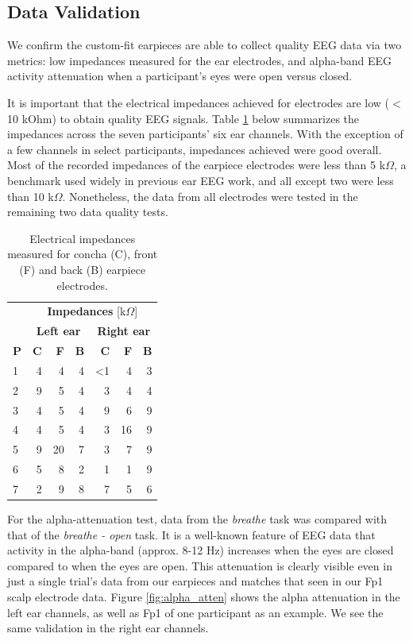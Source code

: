 \documentclass{sigchi}
\begin{document}
\subsection{Data Validation}

We confirm the custom-fit earpieces are able to collect quality EEG data via two metrics: low impedances measured for the ear electrodes, and alpha-band EEG activity attenuation when a participant's eyes were open versus closed.

It is important that the electrical impedances achieved for electrodes are low ($<$10 kOhm) to obtain quality EEG signals. Table \ref{tab:impedances} below summarizes the impedances across the seven participants' six ear channels. With the exception of a few channels in select participants, impedances achieved were good overall. Most of the recorded impedances of the earpiece electrodes were less than 5 k\(\Omega\), a benchmark used widely in previous ear EEG work, and all except two were less than 10 k\(\Omega\). Nonetheless, the data from all electrodes were tested in the remaining two data quality tests.

\begin{table}[h]
\begin{center}
\begin{tabular}{lrrrrrr}
& \multicolumn{6}{c}{\textbf{Impedances} [k\(\Omega\)]} \\
\cline{2-7}
& \multicolumn{3}{|c|}{\textbf{Left ear}} & \multicolumn{3}{c|}{\textbf{Right ear}} \\
\textbf{P} & \textbf{C} & \textbf{F} & \textbf{B} & \textbf{C} & \textbf{F} & \textbf{B} \\
\hline
1 & 4 & 4 & 4 & \textless1 & 4 & 3\\
2 & 9 & 5 & 4 & 3 & 4 & 4\\
3 & 4 & 5 & 4 & 9 & 6 & 9\\
4 & 4 & 5 & 4 & 3 & 16 & 9\\
5 & 9 & 20 & 7 & 3 & 7 & 9\\
6 & 5 & 8 & 2 & 1 & 1 & 9\\
7 & 2 & 9 & 8 & 7 & 5 & 6\\
\end{tabular}
\end{center}
\caption{Electrical impedances measured for concha (C), front (F) and back (B) earpiece electrodes.}
\label{tab:impedances}
\end{table}

For the alpha-attenuation test, data from the \textit{breathe} task was compared with that of the \textit{breathe - open} task. It is a well-known feature of EEG data that activity in the alpha-band (approx. 8-12 Hz) increases when the eyes are closed compared to when the eyes are open. This attenuation is clearly visible even in just a single trial's data from our earpieces and matches that seen in our Fp1 scalp electrode data. Figure \ref{fig:alpha_atten} shows the alpha attenuation in the left ear channels, as well as Fp1 of one participant as an example. We see the same validation in the right ear channels.
\end{document}
